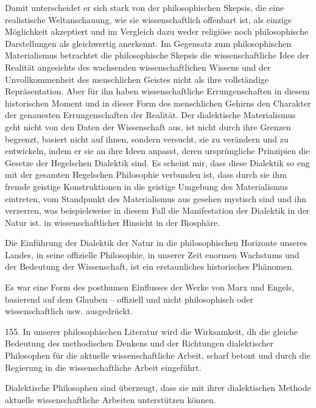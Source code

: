 \documentclass[11pt,a4paper]{book}
\begin{document}
Damit unterscheidet er sich stark von der philosophischen Skepsis, die eine realistische Weltanschauung, wie sie wissenschaftlich offenbart ist, als einzige Möglichkeit akzeptiert und im Vergleich dazu weder religiöse noch philosophische Darstellungen als gleichwertig anerkennt. Im Gegensatz zum philosophischen Materialismus betrachtet die philosophische Skepsis die wissenschaftliche Idee der Realität angesichts des wachsenden wissenschaftlichen Wissens und der Unvollkommenheit des menschlichen Geistes nicht als ihre vollständige Repräsentation. Aber für ihn haben wissenschaftliche Errungenschaften in diesem historischen Moment und in dieser Form des menschlichen Gehirns den Charakter der genauesten Errungenschaften der Realität. Der dialektische Materialismus geht nicht von den Daten der Wissenschaft aus, ist nicht durch ihre Grenzen begrenzt, basiert nicht auf ihnen, sondern versucht, sie zu verändern und zu entwickeln, indem er sie an ihre Ideen anpasst, deren ursprüngliche Prinzipien die Gesetze der Hegelschen Dialektik sind. Es scheint mir, dass diese Dialektik so eng mit der gesamten Hegelschen Philosophie verbunden ist, dass durch sie ihm fremde geistige Konstruktionen in die geistige Umgebung des Materialismus eintreten, vom Standpunkt des Materialismus aus gesehen mystisch sind und ihn verzerren, was beispielsweise in diesem Fall die Manifestation der Dialektik in der Natur ist. in wissenschaftlicher Hinsicht in der Biosphäre.



Die Einführung der Dialektik der Natur in die philosophischen Horizonte unseres Landes, in seine offizielle Philosophie, in unserer Zeit enormen Wachstums und der Bedeutung der Wissenschaft, ist ein erstaunliches historisches Phänomen.



Es war eine Form des posthumen Einflusses der Werke von Marx und Engels, basierend auf dem Glauben -- offiziell und nicht philosophisch oder wissenschaftlich usw. ausgedrückt.



155. In unserer philosophischen Literatur wird die Wirksamkeit, dh die gleiche Bedeutung des methodischen Denkens und der Richtungen dialektischer Philosophen für die aktuelle wissenschaftliche Arbeit, scharf betont und durch die Regierung in die wissenschaftliche Arbeit eingeführt.



Dialektische Philosophen sind überzeugt, dass sie mit ihrer dialektischen Methode aktuelle wissenschaftliche Arbeiten unterstützen können.
\end{document}
